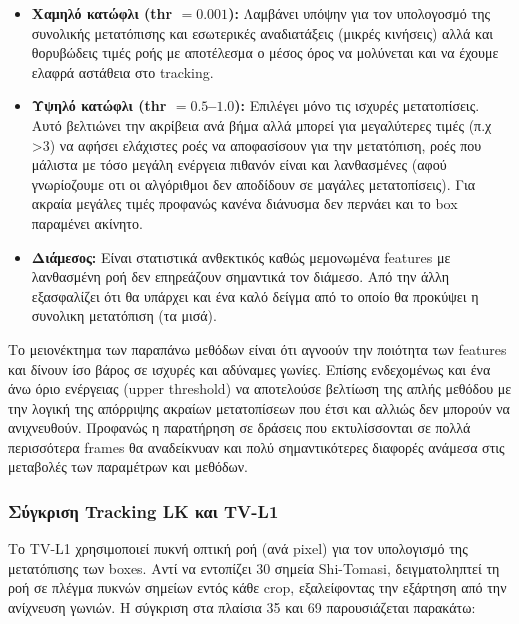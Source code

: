 \documentclass[12pt]{article}
\begin{document}
\begin{itemize}
    \item \textbf{Χαμηλό κατώφλι (thr $= 0.001$):} Λαμβάνει υπόψην για τον υπολογοσμό της συνολικής μετατόπισης και εσωτερικές αναδιατάξεις (μικρές κινήσεις) αλλά και θορυβώδεις τιμές ροής με αποτέλεσμα ο μέσος όρος να μολύνεται και να έχουμε ελαφρά αστάθεια στο tracking.

    \item \textbf{Υψηλό κατώφλι (thr $= 0.5$--$1.0$):} Επιλέγει μόνο τις ισχυρές μετατοπίσεις. Αυτό βελτιώνει την ακρίβεια ανά βήμα αλλά μπορεί για μεγαλύτερες τιμές (π.χ >3) να αφήσει ελάχιστες ροές να αποφασίσουν για την μετατόπιση, ροές που μάλιστα με τόσο μεγάλη ενέργεια πιθανόν είναι και λανθασμένες (αφού γνωρίοζουμε οτι οι αλγόριθμοι δεν αποδίδουν σε μαγάλες μετατοπίσεις). Για ακραία μεγάλες τιμές προφανώς κανένα διάνυσμα δεν περνάει και το box παραμένει ακίνητο.

    \item \textbf{Διάμεσος:} Είναι στατιστικά ανθεκτικός καθώς μεμονωμένα features με λανθασμένη ροή δεν επηρεάζουν σημαντικά τον διάμεσο. Από την άλλη εξασφαλίζει ότι θα υπάρχει και ένα καλό δείγμα από το οποίο θα προκύψει η συνολικη μετατόπιση (τα μισά).
\end{itemize}

Το μειονέκτημα των παραπάνω μεθόδων είναι ότι αγνοούν την ποιότητα των features και δίνουν ίσο βάρος σε ισχυρές και αδύναμες γωνίες. Επίσης ενδεχομένως και ένα άνω όριο ενέργειας (upper threshold) να αποτελούσε βελτίωση της απλής μεθόδου με την λογική της απόρριψης ακραίων μετατοπίσεων που έτσι και αλλιώς δεν μπορούν να ανιχνευθούν. Προφανώς η παρατήρηση σε δράσεις που εκτυλίσσονται σε πολλά περισσότερα frames θα αναδείκνυαν και πολύ σημαντικότερες διαφορές ανάμεσα στις μεταβολές των παραμέτρων και μεθόδων.

\subsubsection*{Σύγκριση Tracking LK και TV-L1}

\hspace{0.6cm}Το TV-L1 χρησιμοποιεί πυκνή οπτική ροή (ανά pixel) για τον υπολογισμό της μετατόπισης των boxes. Αντί να εντοπίζει 30 σημεία Shi-Tomasi, δειγματοληπτεί τη ροή σε πλέγμα πυκνών σημείων εντός κάθε crop, εξαλείφοντας την εξάρτηση από την ανίχνευση γωνιών. Η σύγκριση στα πλαίσια 35 και 69 παρουσιάζεται παρακάτω:
\end{document}
